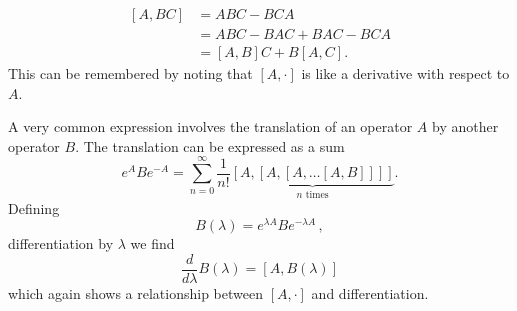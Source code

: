

\begin{align}
  \left[A,BC\right] &= ABC - BCA \nonumber \\
  & = ABC - BAC + BAC - BCA \nonumber \\
  & = [A,B]C + B[A,C].
\end{align}
This can be remembered by noting that $[A,\cdot]$ is like a derivative with respect to $A$.


A very common expression involves the translation of an operator $A$ by another operator $B$.
The translation can be expressed as a sum
\begin{equation}
  e^{A}Be^{-A}=\sum_{n=0}^{\infty}\frac{1}{n!}\underbrace{[A,[A,[A,\ldots[A,B]]]]}_{n\textrm{ times}}. \label{eq:translationSum}
\end{equation}
Defining
\begin{equation}
  B(\lambda) = e^{\lambda A} B e^{-\lambda A}
  \, ,
\end{equation}
differentiation by $\lambda$ we find
\begin{equation}
  \frac{d}{d\lambda}B(\lambda) = [A, B(\lambda)]
\end{equation}
which again shows a relationship between $[A, \cdot]$ and differentiation.



